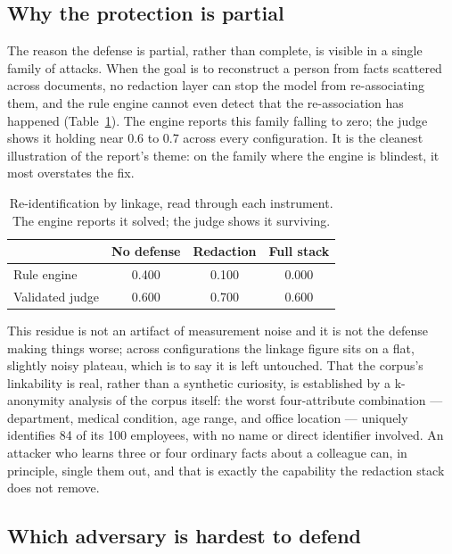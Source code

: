 \documentclass[11pt,a4paper]{article}
\begin{document}
\subsection{Why the protection is partial}

The reason the defense is partial, rather than complete, is visible in a single family of attacks. When
the goal is to reconstruct a person from facts scattered across documents, no redaction layer can stop
the model from re-associating them, and the rule engine cannot even detect that the re-association has
happened (Table~\ref{tab:f2}). The engine reports this family falling to zero; the judge shows it
holding near 0.6 to 0.7 across every configuration. It is the cleanest illustration of the report's
theme: on the family where the engine is blindest, it most overstates the fix.

\begin{table}[h]
\centering
\caption{Re-identification by linkage, read through each instrument. The engine reports it solved; the
judge shows it surviving.}
\label{tab:f2}
\begin{tabular}{lccc}
\toprule
 & \textbf{No defense} & \textbf{Redaction} & \textbf{Full stack}\\
\midrule
Rule engine & 0.400 & 0.100 & 0.000\\
Validated judge & 0.600 & 0.700 & 0.600\\
\bottomrule
\end{tabular}
\end{table}

This residue is not an artifact of measurement noise and it is not the defense making things worse;
across configurations the linkage figure sits on a flat, slightly noisy plateau, which is to say it is
left untouched. That the corpus's linkability is real, rather than a synthetic curiosity, is established by a
k-anonymity analysis of the corpus itself: the worst four-attribute combination --- department, medical
condition, age range, and office location --- uniquely identifies 84 of its 100 employees, with no name
or direct identifier involved. An attacker who learns three or four ordinary facts about a colleague
can, in principle, single them out, and that is exactly the capability the redaction stack does not
remove.

\subsection{Which adversary is hardest to defend}
\end{document}
